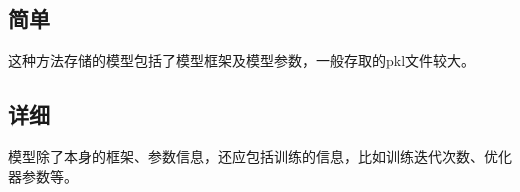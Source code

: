 \documentclass[letterpaper,10pt,english]{sphinxmanual}
\begin{document}
\subsection{简单}
\label{\detokenize{deepLearning/05_modelSave:id1}}
%
\begin{sphinxVerbatim}[commandchars=\\\{\}]
 
 
  
\end{sphinxVerbatim}

这种方法存储的模型包括了模型框架及模型参数，一般存取的pkl文件较大。


\subsection{详细}
\label{\detokenize{deepLearning/05_modelSave:id2}}
模型除了本身的框架、参数信息，还应包括训练的信息，比如训练迭代次数、优化器参数等。
\end{document}
